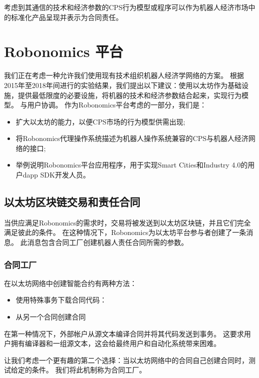 \documentclass[UTF8]{article}
\begin{document}
考虑到其通信的技术和经济参数的CPS行为模型或程序可以作为机器人经济市场中的标准化产品呈现并表示为合同责任。

\section{Robonomics 平台}

我们正在考虑一种允许我们使用现有技术组织机器人经济学网络的方案。 根据2015年至2018年间进行的实验结果，我们提出以下建议：使用以太坊作为基础设施，提供最低限度的必要设施，将机器的技术和经济参数结合起来，实现行为模型。 与用户协调。 作为Robonomics平台考虑的一部分，我们是：

\begin{itemize}[noitemsep]
	\item 扩大以太坊的能力，以便CPS市场的行为模型供需出现;
	\item 将Robonomics代理操作系统描述为机器人操作系统兼容的CPS与机器人经济网络的接口\cite{Quigley2009ROS:System};
	\item 举例说明Robonomics平台应用程序，用于实现Smart Cities和Industry 4.0的用户dapp SDK开发人员。
\end{itemize}

\subsection{以太坊区块链交易和责任合同}

当供应满足Robonomics的需求时，交易将被发送到以太坊区块链，并且它们完全满足彼此的条件。 在这种情况下，Robonomics为以太坊平台参与者创建了一条消息。 此消息包含合同工厂创建机器人责任合同所需的参数。

\subsubsection{合同工厂}

在以太坊网络中创建智能合约有两种方法：
\begin{itemize}[noitemsep]
	\item 使用特殊事务下载合同代码：
	\item 从另一个合同创建合同
\end{itemize}

在第一种情况下，外部帐户从源文本编译合同并将其代码发送到事务。 这要求用户拥有编译器和一组源文本，这会给最终用户和自动化系统带来困难。

让我们考虑一个更有趣的第二个选择：当以太坊网络中的合同自己创建合同时，测试给定的条件。 我们将此机制称为合同工厂。
\end{document}
